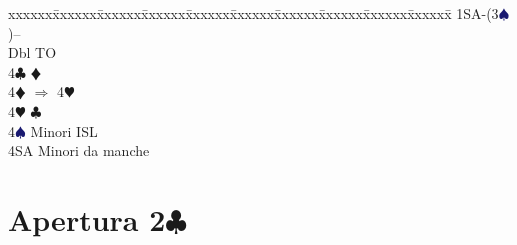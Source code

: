 \documentclass[a4paper,italian]{article}
\newcommand{\BC}{\textcolor{OliveGreen}{$\clubsuit$}}
\newcommand{\BD}{\textcolor{RedOrange}{$\vardiamondsuit$}}
\newcommand{\BH}{\textcolor{Red2}{$\varheartsuit${}}}
\newcommand{\BS}{\textcolor{MidnightBlue}{$\spadesuit${}}}
\newcommand{\pdfc}{\texorpdfstring{\BC{}}{C}}
\newenvironment{bidtable}
{\begin{tabbing}

    xxxxxx\=xxxxxx\=xxxxxx\=xxxxxx\=xxxxxx\=xxxxxx\=xxxxxx\=xxxxxx\=xxxxxx\=xxxxxx\=\kill}
{\end{tabbing} }%
\begin{document}
\begin{multicols}{2}
    \begin{bidtable}
        1SA-(3\BS)--\+\\
        Dbl \> TO\\
        4\BC \> \BD \\
        4\BD \> $\Rightarrow$ 4\BH \\
        4\BH \> \BC \\
        4\BS \> Minori ISL\\
        4SA \> Minori da manche\-
    \end{bidtable}

\end{multicols}

\newpage

\section{Apertura 2\pdfc}
\end{document}
